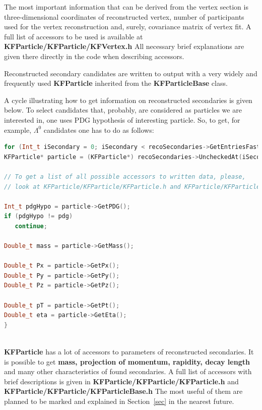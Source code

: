 \documentclass[8pt,a5paper, oldfontcommands]{memoir}
\begin{document}
The most important information that can be derived from the vertex section is three-dimensional coordinates of reconstructed vertex, number of participants used for the vertex reconstruction and,
surely, covariance matrix of vertex fit. A full list of accessors to be used is available at {\color{red} \bf KFParticle/KFParticle/KFVertex.h}
All necessary brief explanations are given there directly in the code when describing accessors.

Reconstructed secondary candidates are written to output with a very widely and frequently used {\bf \color{red} KFParticle} inherited from the {\bf \color{red} KFParticleBase} class.

A cycle illustrating how to get information on reconstructed secondaries is given below.
To select candidates that, probably, are considered as particles we are interested in, one uses PDG hypothesis of interesting particle.
So, to get, for example, $\Lambda^{0}$ candidates one has to do as follows:

{ \tiny
  \begin{lstlisting}[language=C++,basicstyle=\ttfamily,keywordstyle=\color{red}, commentstyle=\color{blue}]
for (Int_t iSecondary = 0; iSecondary < recoSecondaries->GetEntriesFast(); iSecondary++) {
KFParticle* particle = (KFParticle*) recoSecondaries->UncheckedAt(iSecondary);
            
// To get a list of all possible accessors to written data, please,
// look at KFParticle/KFParticle/KFParticle.h and KFParticle/KFParticle/KFParticleBase.h
            
Int_t pdgHypo = particle->GetPDG();
if (pdgHypo != pdg)
   continue;
            
Double_t mass = particle->GetMass();

Double_t Px = particle->GetPx();
Double_t Py = particle->GetPy();
Double_t Pz = particle->GetPz();
            
Double_t pT = particle->GetPt();
Double_t eta = particle->GetEta();
}
    
  \end{lstlisting}
}

\thispagestyle{plain}
{\bf \color {red} KFParticle} has a lot of accessors to parameters of reconstructed secondaries. It is possible to get {\bf \color{blue} mass, projection of momentum, rapidity, decay length} and many other characteristics of found secondaries.
A full list of accessors with brief descriptions is given in {\bf \color{red} KFParticle/KFParticle/KFParticle.h} and {\bf \color{red} KFParticle/KFParticle/KFParticleBase.h}
The most useful of them are planned to be marked and explained in Section~\ref{sec} in the nearest future.
\end{document}
